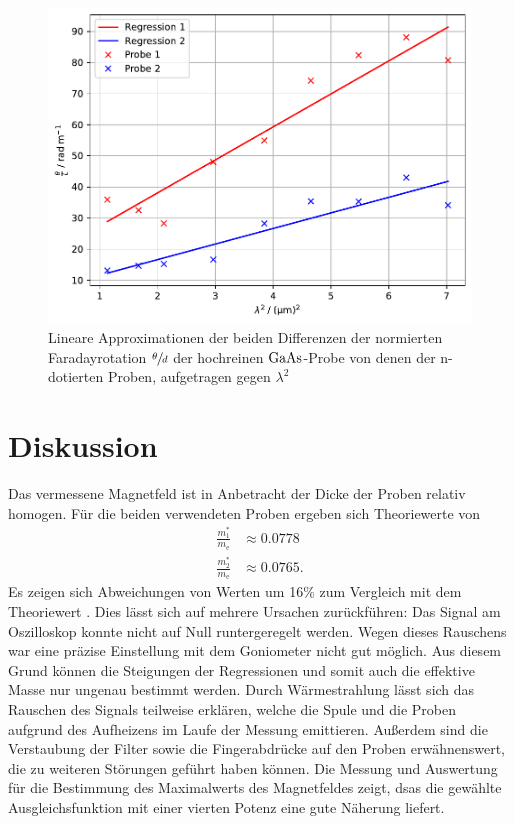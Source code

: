 \documentclass[
  bibliography=totoc,     %
  captions=tableheading,  %
  titlepage=firstiscover, %
]{scrartcl}
\begin{document}
\begin{figure}[H]
    \centering
    \includegraphics[scale=0.7]{build/differenzen.pdf}
    \caption{Lineare Approximationen der beiden Differenzen der normierten Faradayrotation $\sfrac{\theta}{d}$ 
              der hochreinen $\ce{GaAs}$-Probe von denen der n-dotierten Proben, aufgetragen gegen $\lambda^2$}
    \label{fig:plot3}
  \end{figure}

  \newpage
  \section{Diskussion}
  \label{sec:Diskussion}
  
  Das vermessene Magnetfeld ist in Anbetracht der Dicke der Proben relativ
  homogen.
  Für die beiden verwendeten Proben ergeben sich Theoriewerte von
  \begin{align*}
    \frac{m^*_1}{m_\text{e}} &\approx \num{0.0778} \\
    \frac{m^*_2}{m_\text{e}} &\approx \num{0.0765}.
  \end{align*}
  Es zeigen sich Abweichungen von Werten um 16\% zum Vergleich mit dem 
  Theoriewert \cite[3]{effmasse}. Dies lässt sich auf mehrere Ursachen zurückführen:
  Das Signal am Oszilloskop konnte nicht auf Null runtergeregelt werden. 
  Wegen dieses Rauschens war eine präzise Einstellung mit dem Goniometer
  nicht gut möglich. Aus diesem Grund können die Steigungen der Regressionen
  und somit auch die effektive Masse nur ungenau bestimmt werden.
  Durch Wärmestrahlung lässt sich das Rauschen des Signals teilweise 
  erklären, welche die Spule und die Proben aufgrund des Aufheizens im Laufe
  der Messung emittieren.
  Außerdem sind die Verstaubung der Filter sowie die Fingerabdrücke auf den
  Proben erwähnenswert, die zu weiteren Störungen geführt haben können.
  Die Messung und Auswertung für die Bestimmung des Maximalwerts des 
  Magnetfeldes zeigt, dsas die gewählte Ausgleichsfunktion mit einer
  vierten Potenz eine gute Näherung liefert.

  \newpage 
  \printbibliography 
\end{document}

